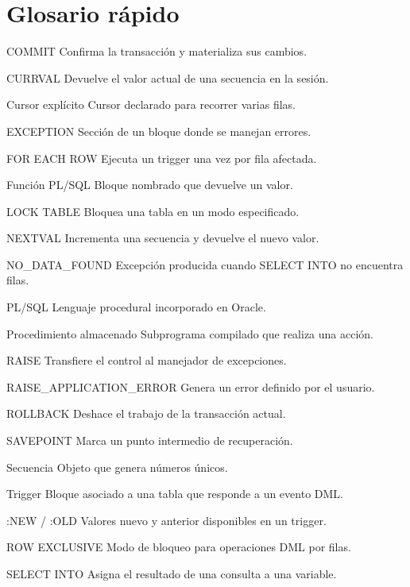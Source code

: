 \documentclass[10pt,letterpaper]{article}
\newif\ifintheorycolumns
\newcommand{\BeginTheory}{%
  \ifintheorycolumns\else
    \begin{multicols}{2}%
    \global\intheorycolumnstrue
  \fi}
\newcommand{\EndTheory}{%
  \ifintheorycolumns
    \global\intheorycolumnsfalse
    \end{multicols}%
  \fi}
\newenvironment{glossarylist}
  {\begin{description}[
    style=unboxed,
    leftmargin=0pt,
    labelindent=0pt,
    labelsep=0.45em,
    itemsep=0.18em,
    parsep=0pt,
    topsep=0.2em,
    font=\normalfont\ttfamily\bfseries]}
  {\end{description}}
\begin{document}
\section*{Glosario rápido}
\BeginTheory
\begin{multicols}{2}
\begin{glossarylist}
\item[COMMIT] Confirma la transacción y materializa sus cambios.
\item[CURRVAL] Devuelve el valor actual de una secuencia en la sesión.
\item[Cursor explícito] Cursor declarado para recorrer varias filas.
\item[EXCEPTION] Sección de un bloque donde se manejan errores.
\item[FOR EACH ROW] Ejecuta un trigger una vez por fila afectada.
\item[Función PL/SQL] Bloque nombrado que devuelve un valor.
\item[LOCK TABLE] Bloquea una tabla en un modo especificado.
\item[NEXTVAL] Incrementa una secuencia y devuelve el nuevo valor.
\item[NO\_DATA\_FOUND] Excepción producida cuando SELECT INTO no encuentra filas.
\item[PL/SQL] Lenguaje procedural incorporado en Oracle.
\item[Procedimiento almacenado] Subprograma compilado que realiza una acción.
\item[RAISE] Transfiere el control al manejador de excepciones.
\item[RAISE\_APPLICATION\_ERROR] Genera un error definido por el usuario.
\item[ROLLBACK] Deshace el trabajo de la transacción actual.
\item[SAVEPOINT] Marca un punto intermedio de recuperación.
\item[Secuencia] Objeto que genera números únicos.
\item[Trigger] Bloque asociado a una tabla que responde a un evento DML.
\item[:NEW / :OLD] Valores nuevo y anterior disponibles en un trigger.
\item[ROW EXCLUSIVE] Modo de bloqueo para operaciones DML por filas.
\item[SELECT INTO] Asigna el resultado de una consulta a una variable.
\end{glossarylist}
\end{multicols}
\EndTheory
\end{document}
